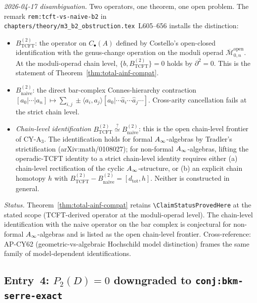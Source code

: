 \emph{2026-04-17 disambiguation.} Two operators, one theorem, one
open problem.  The remark \texttt{rem:tcft-vs-naive-b2} in
\texttt{chapters/theory/m3\_b2\_obstruction.tex}~L605--656 installs
the distinction:
\begin{itemize}
 \item $B^{(2)}_{\mathrm{TCFT}}$: the operator on $C_\bullet(A)$
  defined by Costello's open-closed identification with the
  genus-change operation on the moduli operad
  $\overline{\mathcal{M}}_{0, n}^{\mathrm{open}}$.  At the moduli-operad
  chain level, $\{b, B^{(2)}_{\mathrm{TCFT}}\} = 0$ holds by
  $\partial^2 = 0$.  This is the statement of
  Theorem~\ref{thm:total-ainf-compat}.
 \item $B^{(2)}_{\mathrm{naive}}$: the direct bar-complex Connes-hierarchy
  contraction $[a_0 | \cdots | a_n] \mapsto \sum_{i, j} \pm
  \langle a_i, a_j \rangle [a_0 | \cdots \hat{a}_i \cdots \hat{a}_j
  \cdots]$.  Cross-arity cancellation fails at the strict chain level.
 \item \emph{Chain-level identification} $B^{(2)}_{\mathrm{TCFT}}
  \overset{?}{\simeq} B^{(2)}_{\mathrm{naive}}$: this is the open
  chain-level frontier of CY-A$_3$.  The identification holds for
  formal $A_{\infty}$-algebras by Tradler's strictification
  (arXiv:math/0108027); for non-formal $A_{\infty}$-algebras, lifting the
  operadic-TCFT identity to a strict chain-level identity requires
  either (a) chain-level rectification of the cyclic $A_{\infty}$-structure,
  or (b) an explicit chain homotopy $h$ with
  $B^{(2)}_{\mathrm{TCFT}} - B^{(2)}_{\mathrm{naive}} = [d_{\mathrm{tot}}, h]$.
  Neither is constructed in general.
\end{itemize}

\emph{Status.} \ClaimStatusHealed{}  Theorem~\ref{thm:total-ainf-compat}
retains \texttt{\textbackslash ClaimStatusProvedHere} at the stated
scope (TCFT-derived operator at the moduli-operad level).  The
chain-level identification with the naive operator on the bar complex
is conjectural for non-formal $A_{\infty}$-algebras and is listed as the
open chain-level frontier.  Cross-reference: AP-CY62
(geometric-vs-algebraic Hochschild model distinction) frames the
same family of model-dependent identifications.

\subsection*{Entry~4: $P_2(D) = 0$ downgraded to
\texttt{conj:bkm-serre-exact}}
\label{wn:sec:tautology-healing-entry4}

